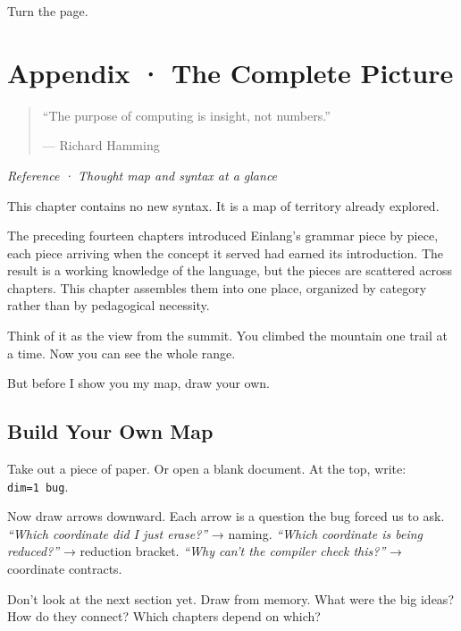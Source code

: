\documentclass[11pt,titlepage]{article}
\begin{document}
Turn the page.

\newpage

\hypertarget{appendix-the-complete-picture}{%
\section{Appendix · The Complete
Picture}\label{appendix-the-complete-picture}}

\begin{quote}
``The purpose of computing is insight, not numbers.''

--- Richard Hamming
\end{quote}

\emph{Reference · Thought map and syntax at a glance}

\vspace{2em}

This chapter contains no new syntax. It is a map of territory already
explored.

The preceding fourteen chapters introduced Einlang's grammar piece by
piece, each piece arriving when the concept it served had earned its
introduction. The result is a working knowledge of the language, but the
pieces are scattered across chapters. This chapter assembles them into
one place, organized by category rather than by pedagogical necessity.

Think of it as the view from the summit. You climbed the mountain one
trail at a time. Now you can see the whole range.

But before I show you my map, draw your own.

\vspace{2em}

\hypertarget{build-your-own-map}{%
\subsection{Build Your Own Map}\label{build-your-own-map}}

Take out a piece of paper. Or open a blank document. At the top, write:
\texttt{dim=1\ bug}.

Now draw arrows downward. Each arrow is a question the bug forced us to
ask. \emph{``Which coordinate did I just erase?''} → naming.
\emph{``Which coordinate is being reduced?''} → reduction bracket.
\emph{``Why can't the compiler check this?''} → coordinate contracts.

Don't look at the next section yet. Draw from memory. What were the big
ideas? How do they connect? Which chapters depend on which?
\end{document}
